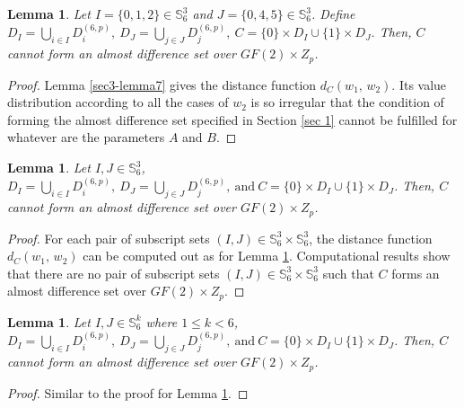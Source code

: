 \documentclass[letter]{ieice}
\newtheorem{sec3_lemma8}[sec3_lemma1]{Lemma}
\newtheorem{sec3_lemma9}[sec3_lemma1]{Lemma}
\newtheorem{sec3_lemma10}[sec3_lemma1]{Lemma}
\begin{document}
\begin{sec3_lemma8}\label{sec3-lemma8}
Let $ I=\lbrace0,1,2\rbrace \in  \mathbb{S}_{6}^{3}$ and $ J=\lbrace0,4,5\rbrace \in  \mathbb{S}_{6}^{3}$. Define $ \mathit{D}_{I}=\bigcup_{i\in I}D_{i}^{(6,p)},\  \mathit{D}_{J}=\bigcup_{j\in J}D_{j}^{(6,p)},\ \mathit{C}=\lbrace 0\rbrace\times  \mathit{D}_{I}\cup \lbrace 1\rbrace\times  \mathit{D}_{J}$. Then, $ \mathit{C} $ cannot form an almost difference set over $ GF(2)\times Z_{p} $.
\end{sec3_lemma8}                                      
\begin{proof}
Lemma \ref{sec3-lemma7} gives the distance function $ d_{\mathit{C}}(w_{1},\,w_{2}) $. Its value distribution according to all the cases of $ w_{2} $ is so irregular that the condition of forming the almost difference set specified in Section \ref{sec 1} cannot be fulfilled for whatever are the parameters $ A $ and $ B $.
\end{proof}
\begin{sec3_lemma9}\label{sec3-lemma9}
Let $ I, J \in  \mathbb{S}_{6}^{3}$,  $ \mathit{D}_{I}=\bigcup_{i\in I}D_{i}^{(6,p)},\  \mathit{D}_{J}=\bigcup_{j\in J}D_{j}^{(6,p)},\ \mbox{and}\ \mathit{C}=\lbrace 0\rbrace\times  \mathit{D}_{I}\cup \lbrace 1\rbrace\times  \mathit{D}_{J}$. Then, $ \mathit{C} $ cannot form an almost difference set over $ GF(2)\times Z_{p} $.
\end{sec3_lemma9}
\begin{proof}
For each pair of subscript sets $ (I,J)\in  \mathbb{S}_{6}^{3}\times   \mathbb{S}_{6}^{3}$, the distance function $ d_{\mathit{C}}(w_{1},\,w_{2}) $ can be computed out as for  Lemma \ref{sec3-lemma9}. Computational results show that there are no pair of subscript sets $ (I,J)\in  \mathbb{S}_{6}^{3}\times   \mathbb{S}_{6}^{3}$ such that  $ \mathit{C} $  forms an almost difference set over $ GF(2)\times Z_{p} $.
\end{proof}
\begin{sec3_lemma10}\label{sec3-lemma10}
Let $ I, J \in  \mathbb{S}_{6}^{k}$ where $ 1\leq k<6 $,  $ \mathit{D}_{I}=\bigcup_{i\in I}D_{i}^{(6,p)},\  \mathit{D}_{J}=\bigcup_{j\in J}D_{j}^{(6,p)},\ \mbox{and}\ \mathit{C}=\lbrace 0\rbrace\times  \mathit{D}_{I}\cup \lbrace 1\rbrace\times  \mathit{D}_{J}$. Then, $ \mathit{C} $ cannot form an almost difference set over $ GF(2)\times Z_{p} $.
\end{sec3_lemma10}
\begin{proof}
Similar to the proof for Lemma \ref{sec3-lemma9}.
\end{proof}
\end{document}
